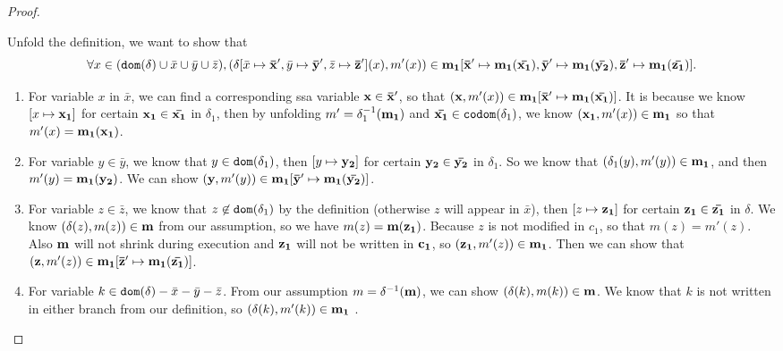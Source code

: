 \documentclass[a4paper,11pt]{article}
\begin{document}
\begin{proof}
\begin{itemize}
Unfold the definition, we want to show that $$\forall x  \in ( \mathtt{dom}(\delta) \cup \bar{x} \cup \bar{y} \cup \bar{z} ), (\delta[\bar{x} \mapsto \mathbf{{\bar{x}'}},\bar{y} \mapsto \mathbf{{\bar{y}'}},\bar{z} \mapsto \mathbf{{\bar{z}'}} ](x), m'(x)) \in \mathbf{{m_1 [ \bar{x}' \mapsto {m_1}(\bar{x_1}),\bar{y}' \mapsto {m_1}(\bar{y_2}),\bar{z}' \mapsto {m_1}(\bar{z_1}) ] }} .$$
\begin{enumerate}
    \item For variable $x$ in $\bar{x}$, we can find a corresponding ssa variable $\mathbf{{x}} \in \mathbf{{\bar{x}'}}$, so that $( \mathbf{{x}}, m'(x) ) \in \mathbf{{ m_1 [\bar{x}' \mapsto m_1(\bar{x_1})] }} $. It is because we know $[x \mapsto \mathbf{{x_1}}]$ for certain $\mathbf{{x_1}} \in \mathbf{{\bar{x_1}}}$ in $\delta_1$, then by unfolding  $m' = \delta_1^{-1}(\mathbf{{m_1}})$ and $\mathbf{{\bar{x_1}}} \in \mathtt{codom}(\delta_1)$, we know $(\mathbf{{x_1}}, m'(x)) \in \mathbf{{m_1}}$ so that $m'(x) = \mathbf{{m_1}}(\mathbf{{x_1}})$.
    \item For variable $y \in \bar{y}$, we know that $y \in \mathtt{dom}(\delta_1)$, then $[ y \mapsto \mathbf{{y_2}} ]$ for certain $\mathbf{{y_2}} \in \mathbf{{\bar{y_2}}}$ in $\delta_1$.  So we know that $(\delta_1(y), m'(y) ) \in \mathbf{{m_1}}$, and then $m'(y) = \mathbf{{m_1(y_2)}}$. We can show $(\mathbf{{y}}, m'(y)) \in \mathbf{{m_1[\bar{y}' \mapsto m_1(\bar{y_2})]}}$.
    \item For variable $z \in \bar{z}$, we know that $z \not\in \mathtt{dom}(\delta_1)$ by the definition (otherwise $z$ will appear in $\bar{x}$), then $[ z \mapsto \mathbf{{z_1}} ]$ for certain $ \mathbf{{z_1}} \in \mathbf{{\bar{z_1}}}$ in $\delta$.  We know $(\delta(z), m(z)) \in \mathbf{{m}}$ from our assumption, so we have $ m(z) = \mathbf{{m(z_1)}}$. Because $z$ is not modified in $c_1$, so that $m(z) = m'(z)$. Also $\mathbf{{m}}$ will not shrink during execution and $\mathbf{{z_1}}$ will not be written in $\mathbf{{c_1}}$, so $(\mathbf{{z_1}}, m'(z)) \in \mathbf{{m_1}}$. Then we can show that $ (\mathbf{{z}}, m'(z) ) \in \mathbf{{m_1[\bar{z}' \mapsto m_1(\bar{z_1})] }}$.
    \item For variable $k \in \mathtt{dom}(\delta)- \bar{x} - \bar{y}-\bar{z}$. From our assumption $ m = \delta^{-1}(\mathbf{{m}})$, we can show $(\delta(k), m(k) ) \in \mathbf{{m}}$. We know that $k$ is not written in either branch from our definition, so $(\delta(k), m'(k) ) \in \mathbf{{m_1}} $ .
\end{enumerate}


\end{itemize}
\end{proof}
\end{document}
